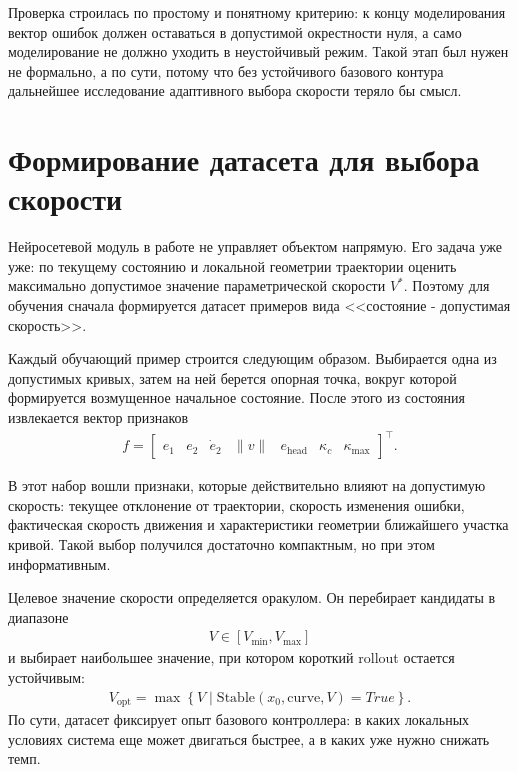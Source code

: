 Проверка строилась по простому и понятному критерию: к концу моделирования вектор ошибок должен оставаться в допустимой окрестности нуля, а само моделирование не должно уходить в неустойчивый режим. Такой этап был нужен не формально, а по сути, потому что без устойчивого базового контура дальнейшее исследование адаптивного выбора скорости теряло бы смысл.

\section{Формирование датасета для выбора скорости}

Нейросетевой модуль в работе не управляет объектом напрямую. Его задача уже уже: по текущему состоянию и локальной геометрии траектории оценить максимально допустимое значение параметрической скорости $V^{\ast}$. Поэтому для обучения сначала формируется датасет примеров вида <<состояние - допустимая скорость>>.

Каждый обучающий пример строится следующим образом. Выбирается одна из допустимых кривых, затем на ней берется опорная точка, вокруг которой формируется возмущенное начальное состояние. После этого из состояния извлекается вектор признаков
\begin{gather}
    f =
    \begin{bmatrix}
        e_1 &
        e_2 &
        \dot{e}_2 &
        \|v\| &
        e_{\mathrm{head}} &
        \kappa_c &
        \kappa_{\max}
    \end{bmatrix}^{\top}.
\end{gather}

В этот набор вошли признаки, которые действительно влияют на допустимую скорость: текущее отклонение от траектории, скорость изменения ошибки, фактическая скорость движения и характеристики геометрии ближайшего участка кривой. Такой выбор получился достаточно компактным, но при этом информативным.

Целевое значение скорости определяется оракулом. Он перебирает кандидаты в диапазоне
\begin{gather}
    V \in [V_{\min}, V_{\max}]
\end{gather}
и выбирает наибольшее значение, при котором короткий rollout остается устойчивым:
\begin{gather}
    V_{\mathrm{opt}} = \max \left\{ V \mid \mathrm{Stable}(x_0,\mathrm{curve},V) = True \right\}.
\end{gather}
По сути, датасет фиксирует опыт базового контроллера: в каких локальных условиях система еще может двигаться быстрее, а в каких уже нужно снижать темп.

